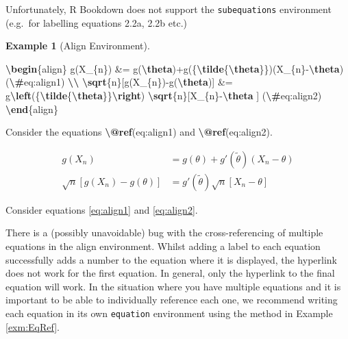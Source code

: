 \documentclass[
]{article}
\newenvironment{Shaded}{\begin{snugshade}}{\end{snugshade}}
\newcommand{\ExtensionTok}[1]{#1}
\newcommand{\FunctionTok}[1]{\textcolor[rgb]{0.13,0.29,0.53}{\textbf{#1}}}
\newcommand{\KeywordTok}[1]{\textcolor[rgb]{0.13,0.29,0.53}{\textbf{#1}}}
\newcommand{\NormalTok}[1]{#1}
\newcommand{\SpecialCharTok}[1]{\textcolor[rgb]{0.81,0.36,0.00}{\textbf{#1}}}
\newcommand{\SpecialStringTok}[1]{\textcolor[rgb]{0.31,0.60,0.02}{#1}}
\numberwithin{equation}{section}
\numberwithin{figure}{section}
\theoremstyle{break}
\theoremstyle{definition}
\theoremstyle{definition}
\newtheorem{example}{Example}[section]
\theoremstyle{definition}
\theoremstyle{definition}
\theoremstyle{remark}
\begin{document}
Unfortunately, R Bookdown does not support the \texttt{subequations} environment (e.g.~for labelling equations 2.2a, 2.2b etc.)

\begin{example}[Align Environment]
\leavevmode

\begin{Shaded}
\begin{Highlighting}[]
\KeywordTok{\textbackslash{}begin}\NormalTok{\{}\ExtensionTok{align}\NormalTok{\}}
\SpecialStringTok{g(X\_\{n\}) \&= g(}\SpecialCharTok{\textbackslash{}theta}\SpecialStringTok{)+g\textquotesingle{}(\{}\SpecialCharTok{\textbackslash{}tilde}\SpecialStringTok{\{}\SpecialCharTok{\textbackslash{}theta}\SpecialStringTok{\}\})(X\_\{n\}{-}}\SpecialCharTok{\textbackslash{}theta}\SpecialStringTok{) (}\SpecialCharTok{\textbackslash{}\#}\SpecialStringTok{eq:align1) }\SpecialCharTok{\textbackslash{}\textbackslash{}}
\SpecialCharTok{\textbackslash{}sqrt}\SpecialStringTok{\{n\}[g(X\_\{n\}){-}g(}\SpecialCharTok{\textbackslash{}theta}\SpecialStringTok{)] \&= g\textquotesingle{}}\SpecialCharTok{\textbackslash{}left}\SpecialStringTok{(\{}\SpecialCharTok{\textbackslash{}tilde}\SpecialStringTok{\{}\SpecialCharTok{\textbackslash{}theta}\SpecialStringTok{\}\}}\SpecialCharTok{\textbackslash{}right}\SpecialStringTok{)}
\SpecialStringTok{  }\SpecialCharTok{\textbackslash{}sqrt}\SpecialStringTok{\{n\}[X\_\{n\}{-}}\SpecialCharTok{\textbackslash{}theta}\SpecialStringTok{ ] }
\SpecialStringTok{(}\SpecialCharTok{\textbackslash{}\#}\SpecialStringTok{eq:align2)}
\KeywordTok{\textbackslash{}end}\NormalTok{\{}\ExtensionTok{align}\NormalTok{\}}
  
\NormalTok{Consider the equations }\FunctionTok{\textbackslash{}@ref}\NormalTok{(eq:align1) and }\FunctionTok{\textbackslash{}@ref}\NormalTok{(eq:align2).}
\end{Highlighting}
\end{Shaded}

\begin{align}
g(X_{n}) &= g(\theta)+g'({\tilde{\theta}})(X_{n}-\theta) \label{eq:align1} \\
\sqrt{n}[g(X_{n})-g(\theta)] &= g'\left({\tilde{\theta}}\right)
  \sqrt{n}[X_{n}-\theta ] 
\label{eq:align2}
\end{align}

Consider equations \eqref{eq:align1} and \eqref{eq:align2}.

\end{example}

There is a (possibly unavoidable) bug with the cross-referencing of multiple equations in the align environment. Whilst adding a label to each equation successfully adds a number to the equation where it is displayed, the hyperlink does not work for the first equation. In general, only the hyperlink to the final equation will work. In the situation where you have multiple equations and it is important to be able to individually reference each one, we recommend writing each equation in its own \texttt{equation} environment using the method in Example \ref{exm:EqRef}.
\end{document}
